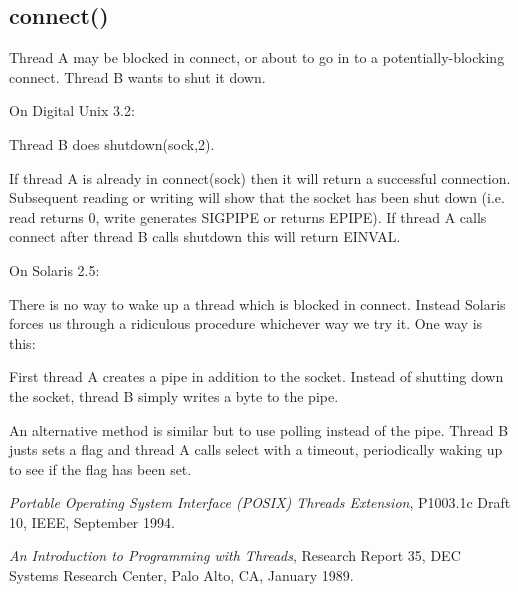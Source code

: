 \documentclass[11pt,twoside,onecolumn]{article}
\begin{document}
\subsection{connect()}

Thread A may be blocked in connect, or about to go in to a potentially-blocking
connect.  Thread B wants to shut it down.


On Digital Unix 3.2:

Thread B does shutdown(sock,2).

If thread A is already in connect(sock) then it will return a successful
connection.  Subsequent reading or writing will show that the socket has been
shut down (i.e. read returns 0, write generates SIGPIPE or returns EPIPE).  If
thread A calls connect after thread B calls shutdown this will return EINVAL.


On Solaris 2.5:

There is no way to wake up a thread which is blocked in connect.  Instead
Solaris forces us through a ridiculous procedure whichever way we try it.
One way is this:

First thread A creates a pipe in addition to the socket.  Instead of shutting
down the socket, thread B simply writes a byte to the pipe.


An alternative method is similar but to use polling instead of the pipe.
Thread B justs sets a flag and thread A calls select with a timeout,
periodically waking up to see if the flag has been set.


\begin{thebibliography}{lo}

{\em Portable Operating System Interface (POSIX) Threads Extension},
P1003.1c Draft 10,
IEEE,
September 1994.

{\em An Introduction to Programming with Threads},
Research Report 35,
DEC Systems Research Center,
Palo Alto, CA,
January 1989.

\end{thebibliography}
\end{document}
